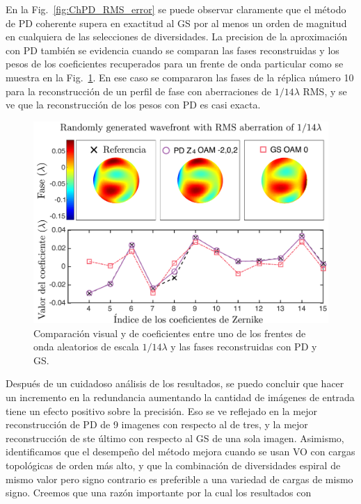 En la Fig.~\ref{fig:ChPD_RMS_error} se puede observar claramente que
el método de PD coherente supera en 
exactitud al GS por al menos un orden de magnitud en cualquiera de las
selecciones de diversidades. La precision de la aproximación con PD
también se evidencia cuando se comparan las fases reconstruidas y los pesos
de los coeficientes recuperados para un frente de onda particular como
se muestra en la Fig.~\ref{fig:ChPD_visual_comparison}. En ese caso se
compararon las fases de la réplica número 10 para la reconstrucción de
un perfil de fase con aberraciones de $1/14\lambda$ RMS, y se ve
que la reconstrucción de los pesos con PD es casi exacta. 
\begin{figure}[h!]
\centering
\includegraphics[scale=.35]{phase_comparison_esp.pdf}
\caption[Resultados visuales de simulaciones de PD coherente para
aberración $1/14\lambda$]{Comparación visual y de coeficientes entre uno de los frentes
  de onda aleatorios de escala $1/14\lambda$ y las fases reconstruidas
  con PD y GS.} 
\label{fig:ChPD_visual_comparison}
\end{figure}
Después de un cuidadoso análisis de los resultados, se puedo concluir que hacer un
incremento en la redundancia aumentando la cantidad de imágenes de
entrada tiene un efecto positivo sobre la precisión. Eso se ve
reflejado en la mejor reconstrucción de PD de 9 imagenes con respecto
al de tres, y la mejor reconstrucción de ste último con respecto al GS
de una sola imagen.  Asimismo, identificamos que el desempeño del
método mejora cuando se usan VO con cargas topológicas de orden más
alto, y que la combinación de diversidades espiral de mismo valor pero
signo contrario es preferible a una variedad de cargas de mismo
signo. Creemos que una razón importante por la cual los resultados con

